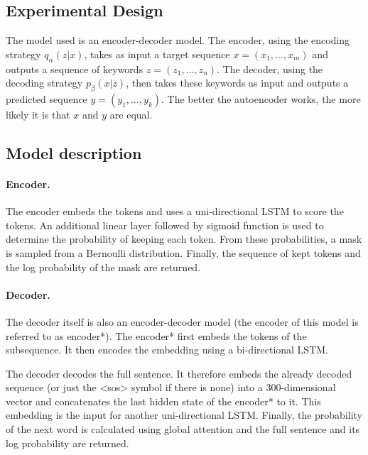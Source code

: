 \documentclass[a4paper, 12pt]{report}
\begin{document}
\subsection{Experimental Design}
The model used is an encoder-decoder model.
The encoder, using the encoding strategy $q_{\alpha}(z|x)$, takes as input a target sequence $x = (x_1, \dots, x_m)$ and outputs a sequence of keywords $z = (z_1, \dots, z_n)$.
The decoder, using the decoding strategy $p_{\beta}(x|z)$, then takes these keywords as input and outputs a predicted sequence $y = (y_1, \dots, y_k)$. 
The better the autoencoder works, the more likely it is that $x$ and $y$ are equal. 

\subsection{Model description}
\paragraph{Encoder.} 
The encoder embeds the tokens and uses a uni-directional LSTM to score the tokens.
An additional linear layer followed by sigmoid function is used to determine the probability of keeping each token. 
From these probabilities, a mask is sampled from a Bernoulli distribution. 
Finally, the sequence of kept tokens and the log probability of the mask are returned.

\paragraph{Decoder.} 
The decoder itself is also an encoder-decoder model (the encoder of this model is referred to as encoder*).
The encoder* first embeds the tokens of the subsequence.
It then encodes the embedding using a bi-directional LSTM. 

The decoder decodes the full sentence. 
It therefore embeds the already decoded sequence (or just the <sos> symbol if there is none) into a 300-dimensional vector and concatenates the last hidden state of the encoder* to it. 
This embedding is the input for another uni-directional LSTM. 
Finally, the probability of the next word is calculated using global attention and the full sentence and its log probability are returned. 
\end{document}
